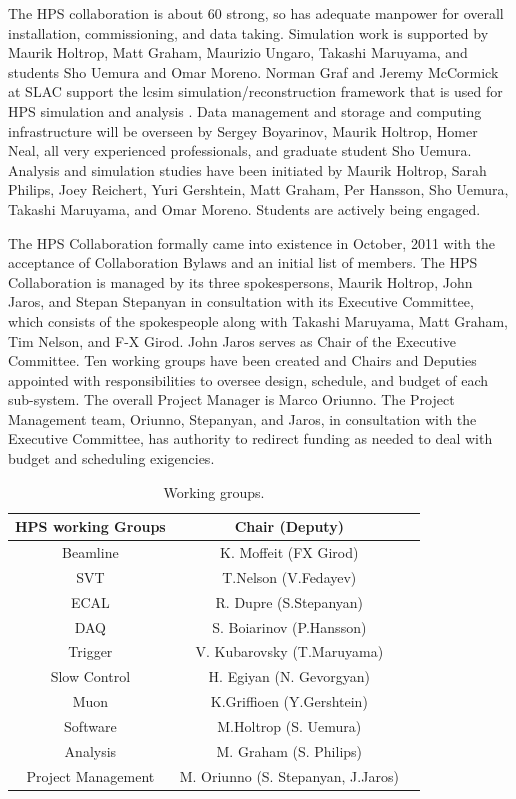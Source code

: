 The HPS collaboration is about 60 strong, so has adequate manpower for overall installation, commissioning, and data taking. Simulation work is supported by Maurik Holtrop, 
Matt Graham, Maurizio Ungaro, Takashi Maruyama, and students Sho Uemura and Omar Moreno. Norman Graf and Jeremy McCormick at SLAC support the lcsim 
simulation/reconstruction framework that is used for HPS simulation and analysis . Data management and storage and computing infrastructure will be overseen by 
Sergey Boyarinov, Maurik Holtrop, Homer Neal, all very experienced professionals, and graduate student Sho Uemura. Analysis and simulation studies have been 
initiated by Maurik Holtrop, Sarah Philips, Joey Reichert, Yuri Gershtein, Matt Graham, Per Hansson, Sho Uemura, Takashi Maruyama, and Omar Moreno. 
Students are actively being engaged.

The HPS Collaboration formally came into existence in October, 2011 with the acceptance of Collaboration Bylaws and an initial list of members.  
The HPS Collaboration is managed by its three spokespersons, Maurik Holtrop, John Jaros, and Stepan Stepanyan in consultation with its Executive Committee, 
which consists of the spokespeople along with Takashi Maruyama, Matt Graham, Tim Nelson, and F-X Girod. John Jaros serves as Chair of the Executive Committee. 
Ten working groups have been created and Chairs and Deputies appointed with responsibilities 
to oversee design, schedule, and budget of each sub-system. The overall Project Manager is Marco Oriunno. The Project Management team, Oriunno, Stepanyan, and Jaros,
in consultation with the Executive Committee, has authority to redirect funding as needed to deal with budget and scheduling exigencies.


\begin{table}[htdp]
\caption{Working groups.}
\begin{center}
\begin{tabular}{|c|c|c|}
\hline
HPS working Groups	& Chair (Deputy)\\
\hline\hline
Beamline	&K. Moffeit (FX Girod)\\
\hline
SVT	&T.Nelson (V.Fedayev)\\
\hline
ECAL	& R. Dupre (S.Stepanyan)\\
\hline
DAQ	 & S. Boiarinov (P.Hansson)\\
\hline
Trigger &	V. Kubarovsky (T.Maruyama)\\
\hline
Slow Control	& H. Egiyan (N. Gevorgyan)\\
\hline
Muon &	K.Griffioen (Y.Gershtein)\\
\hline
Software	& M.Holtrop (S. Uemura)\\
\hline
Analysis &	M. Graham (S. Philips)\\
\hline
Project Management &	M. Oriunno (S. Stepanyan, J.Jaros)\\
\hline
\end{tabular}
\end{center}
\label{tb:groups}
\end{table}%

